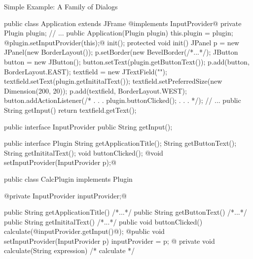 \begin{frame}[fragile]{Simple Example: A Family of Dialogs}
	\begin{mycolumns}[columns=2,widths={50,50}]
\tiny
\begin{codetight}{}
public class Application extends JFrame @implements InputProvider@ {
	private Plugin plugin;
	// ...
	public Application(Plugin plugin) {
		this.plugin = plugin;
		@plugin.setInputProvider(this);@
		init();
	}
	protected void init() {
		JPanel p = new JPanel(new BorderLayout());
		p.setBorder(new BevelBorder(/*...*/);
		JButton button = new JButton();
		button.setText(plugin.getButtonText());
		p.add(button, BorderLayout.EAST);
		textfield = new JTextField("");
		textfield.setText(plugin.getInititalText());
		textfield.setPreferredSize(new Dimension(200, 20));
		p.add(textfield, BorderLayout.WEST);		
		button.addActionListener(/* . . . plugin.buttonClicked(); . . . */);		
		// ...
	}
	public String getInput() {
		return textfield.getText();
	}
}
\end{codetight}
		\mynextcolumn
{\tiny
\begin{codetight}{}
public interface InputProvider {
	public String getInput();
}
\end{codetight}
\begin{codetight}{}
public interface Plugin {
	String getApplicationTitle();
	String getButtonText();
	String getInititalText();
	void buttonClicked();
	@void setInputProvider(InputProvider p);@
}
\end{codetight}
\begin{codetight}{}
public class CalcPlugin implements Plugin {
	@private InputProvider inputProvider;@

	public String getApplicationTitle() { /*...*/ }
	public String getButtonText() { /*...*/ }
	public String getInititalText() { /*...*/ }
	public void buttonClicked() {
		calculate(@inputProvider.getInput()@);
	}
	@public void setInputProvider(InputProvider p) {
		inputProvider = p;
	}@
	private void calculate(String expression) {
		/* calculate */
	}
}
\end{codetight}
}
	\end{mycolumns}
\end{frame}

